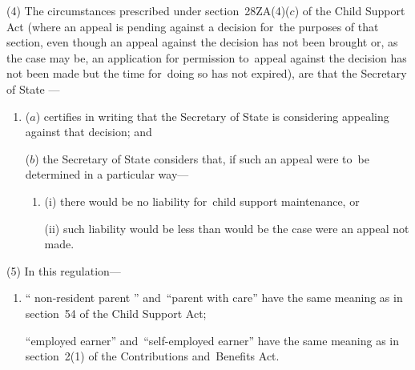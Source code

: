 \documentclass[12pt,a4paper]{article}
\begin{document}
(4) The circumstances prescribed under section~28ZA(4)($c$) of the Child Support Act (where an appeal is pending against a decision for~the purposes of that section, even though an appeal against the decision has not been brought or, as the case may be, an application for 
permission  %
to~appeal against the decision has not been made but the time for~doing so has not expired), are that the 
Secretary of State%
—
\begin{enumerate}\item[]
($a$) certifies in writing that 
the Secretary of State  %
is considering appealing against that decision; and

($b$) 
the Secretary of State  %
considers that, if such an appeal were to~be determined in a particular way—
\begin{enumerate}\item[]
(i) there would be no liability for~child support maintenance, or

(ii) such liability would be less than would be the case were an appeal not made.
\end{enumerate}
\end{enumerate}

(5) In this regulation—
\begin{enumerate}\item[]
“%
non-resident parent%
” and~“parent with care” have the same meaning as in section~54 of the Child Support Act;

“employed earner” and~“self-employed earner” have the same meaning as in section~2(1) of the Contributions and~Benefits Act.
\end{enumerate}
\end{document}
